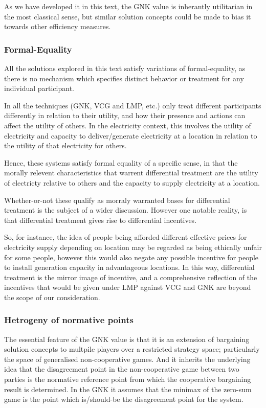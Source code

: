 As we have developed it in this text, the GNK value is inherantly utilitarian in the most classical sense, but similar solution concepts could be made to bias it towards other efficiency measures.

\subsubsection*{Formal-Equality}

All the solutions explored in this text satisfy variations of formal-equality, as there is no mechanism which specifies distinct behavior or treatment for any individual participant.

In all the techniques (GNK, VCG and LMP, etc.) only treat different participants differently in relation to their utility, and how their presence and actions can affect the utility of others.
In the electricity context, this involves the utility of electricity and capacity to deliver/generate electricity at a location in relation to the utility of that electricity for others.

Hence, these systems satisfy formal equality of a specific sense, in that the morally relevent characteristics that warrent differential treatment are the utility of electricty relative to others and the capacity to supply electricity at a location.

Whether-or-not these qualify as morraly warranted bases for differential treatment is the subject of a wider discussion.
However one notable reality, is that differential treatment gives rise to differential incentives.

So, for instance, the idea of people being afforded different effective prices for electricity supply depending on location may be regarded as being ethically unfair for some people, however this would also negate any possible incentive for people to install generation capacity in advantageous locations.
In this way, differential treatment is the mirror image of incentive, and a comprehensive reflection of the incentives that would be given under LMP against VCG and GNK are beyond the scope of our consideration.

\subsubsection*{Hetrogeny of normative points}

The essential feature of the GNK value is that it is an extension of bargaining solution concepts to multpile players over a restricted strategy space; particularly the space of generalised non-cooperative games.
And it inherits the underlying idea that the disagreement point in the non-cooperative game between two parties is the normative reference point from which the cooperative bargaining result is determined.
In the GNK it assumes that the minimax of the zero-sum game is the point which is/should-be the disagreement point for the system.

